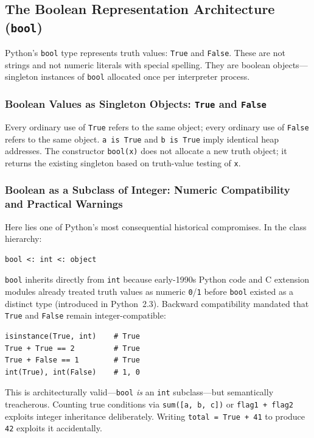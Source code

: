 \subsection{The Boolean Representation Architecture (\texttt{bool})}

Python's \texttt{bool} type represents truth values: \texttt{True} and \texttt{False}. These are not strings and not numeric literals with special spelling. They are boolean objects---singleton instances of \texttt{bool} allocated once per interpreter process.

\subsubsection{Boolean Values as Singleton Objects: \texttt{True} and \texttt{False}}

Every ordinary use of \texttt{True} refers to the same object; every ordinary use of \texttt{False} refers to the same object. \texttt{a is True} and \texttt{b is True} imply identical heap addresses. The constructor \texttt{bool(x)} does not allocate a new truth object; it returns the existing singleton based on truth-value testing of \texttt{x}.

\subsubsection{Boolean as a Subclass of Integer: Numeric Compatibility and Practical Warnings}

Here lies one of Python's most consequential historical compromises. In the class hierarchy:

\begin{verbatim}
bool <: int <: object
\end{verbatim}

\texttt{bool} inherits directly from \texttt{int} because early-1990s Python code and C extension modules already treated truth values as numeric \texttt{0}/\texttt{1} before \texttt{bool} existed as a distinct type (introduced in Python~2.3). Backward compatibility mandated that \texttt{True} and \texttt{False} remain integer-compatible:

\begin{verbatim}
isinstance(True, int)    # True
True + True == 2         # True
True + False == 1        # True
int(True), int(False)    # 1, 0
\end{verbatim}

This is architecturally valid---\texttt{bool} \emph{is} an \texttt{int} subclass---but semantically treacherous. Counting true conditions via \texttt{sum([a, b, c])} or \texttt{flag1 + flag2} exploits integer inheritance deliberately. Writing \texttt{total = True + 41} to produce \texttt{42} exploits it accidentally.


